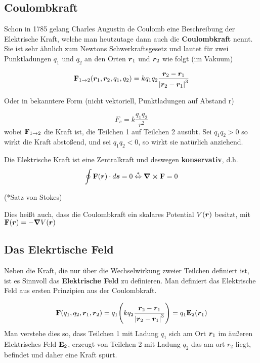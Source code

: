 \subsection{Coulombkraft}%
\label{ssub:Coulombkraft}
Schon in 1785 gelang Charles Augustin de Coulomb eine Beschreibung der
Elektrische Kraft, welche man heutzutage dann auch die 
\textbf{Coulombkraft} 
nennt. Sie ist sehr ähnlich zum Newtons Schwerkraftsgesetz und lautet für 
zwei Punktladungen $q_1$ und $q_2$ an den Orten $\vb*r_1$ und $\vb*r_2$ wie 
folgt (im Vakuum)

\begin{equation}
  \vb F_{1\to2}(\vb*r_1, \vb*r_2, q_1, q_2)= k q_1 q_2 \frac{\vb*r_2-\vb*r_1}{\abs{\vb*r_2-\vb*r_1}^3} 
\end{equation}

\noindent
\begin{center}
Oder in bekanntere Form (nicht vektoriell, Punktladungen auf Abstand r)
\end{center}
\begin{equation*}
  F_c = k \frac{q_1 q_2}{r^2} 
\end{equation*}
wobei $\vb F_{1\to2}$ die Kraft ist, die Teilchen 1 auf Teilchen 2 ausübt. 
Sei $q_1q_2>0$ so wirkt die Kraft abstoßend, 
und sei $q_1q_2<0$, so wirkt sie natürlich anziehend.

\noindent
Die Elektrische Kraft ist eine Zentralkraft und deswegen 
\textbf{konservativ}, d.h. 
\begin{equation}
  \oint \vb F(\vb* r) \cdot d\vb*s = 0 \stackrel{*}{\Leftrightarrow} \curl \vb F =0
\end{equation}
\begin{center}
(*Satz von Stokes)
\end{center}
Dies heißt auch, dass die Coulombkraft ein skalares Potential $V(\vb*r)$ besitzt, mit
$\vb F(\vb*r)=-\grad V(\vb*r)$

\subsection{Das Elekrtische Feld}%
\label{ssub:E-feld}
Neben die Kraft, die nur über die Wechselwirkung zweier Teilchen definiert
ist, ist es Sinnvoll das \textbf{Elektrische Feld} zu definieren. Man 
definiert das Elektrische Feld aus ersten Prinzipien aus der Coulombkraft.

\begin{equation*}
  \vb F(q_1, q_2, \vb*r_1, \vb*r_2) 
  = 
  q_1 
  \qty(k q_2 \frac{\vb*r_2 - \vb*r_1}{\abs{\vb*r_2 - \vb*r_1}^3})
  = q_1 \vb E_2(\vb*r_1)
\end{equation*}
Man verstehe dies so, dass Teilchen 1 mit Ladung $q_1$ 
sich am Ort $\vb*r_1$ im äußeren Elektrisches Feld $\vb E_2$, 
erzeugt von Teilchen 2 mit 
Ladung $q_2$ das am ort $r_2$ liegt, befindet und daher eine Kraft spürt.

